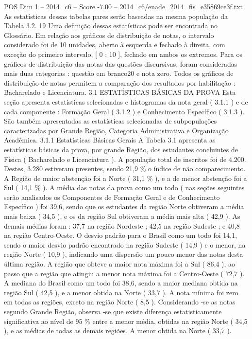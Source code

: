 \begin{textsample}{POS Dim 1 – 2014\_c6 – Score -7.00 – 2014\_c6/enade\_2014\_fis\_e35869ce3f.txt}
As estatísticas dessas tabelas pares serão baseadas na mesma população da Tabela 3.2. 19 Uma definição dessas estatísticas pode ser encontrada no Glossário.
Em relação aos gráficos de distribuição de notas, o intervalo considerado foi de 10 unidades, aberto à esquerda e fechado à direita, com exceção do primeiro intervalo, [ 0 ; 10 ], fechado em ambos os extremos.
Para os gráficos de distribuição das notas das questões discursivas, foram consideradas mais duas categorias : questão em branco20 e nota zero.
Todos os gráficos de distribuição de notas permitem a comparação dos resultados por habilitação : Bacharelado e Licenciatura. 3.1 ESTATÍSTICAS BÁSICAS DA PROVA Esta seção apresenta estatísticas selecionadas e histogramas da nota geral ( 3.1.1 ) e de cada componente : Formação Geral ( 3.1.2 ) e Conhecimento Específico ( 3.1.3 ).
São também apresentadas as estatísticas selecionadas de subpopulações caracterizadas por Grande Região, Categoria Administrativa e Organização Acadêmica. 3.1.1 Estatísticas Básicas Gerais A Tabela 3.1 apresenta as estatísticas básicas da prova, por grande Região, dos estudantes concluintes de Física ( Bacharelado e Licenciatura ).
A população total de inscritos foi de 4.200.
Destes, 3.280 estiveram presentes, sendo 21,9 \% o índice de não comparecimento.
A Região de maior abstenção foi a Norte ( 31,1 \% ), e a de menor abstenção foi a Sul ( 14,1 \% ).
A média das notas da prova como um todo ( nas seções seguintes serão analisados os Componentes de Formação Geral e de Conhecimento Específico ) foi 39,6, sendo que os estudantes da região Norte obtiveram a média mais baixa ( 34,5 ), e os da região Sul obtiveram a média mais alta ( 42,9 ).
As demais médias foram : 37,7 na região Nordeste ; 42,5 na região Sudeste ; e 40,8 na região Centro-Oeste.
O desvio padrão para o Brasil como um todo foi 14,1, sendo o maior desvio padrão encontrado na região Sudeste ( 14,9 ) e o menor, na região Norte ( 10,9 ), indicando uma dispersão um pouco menor das notas desta última região.
A região que obteve a maior nota máxima foi a Sul ( 86,4 ), ao passo que a região que atingiu a menor nota máxima foi a Centro-Oeste ( 72,7 ).
A mediana do Brasil como um todo foi 38,6, sendo a maior mediana obtida na região Sul ( 42,5 ), e a menor obtida na Norte ( 33,7 ).
A nota mínima foi zero em todas as regiões, exceto na região Norte ( 8,5 ).
Considerando -se as notas segundo Grande Região, observa -se que existe diferença estatisticamente significativa ao nível de 95 \% entre a menor média, obtidas na região Norte ( 34,5 ), e as médias de todas as demais regiões.
A menor obtida na Norte ( 33,7 ).

\end{textsample}
